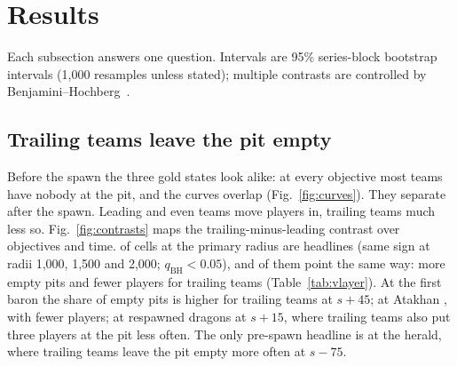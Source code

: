 \section{Results}
\label{sec:results}

Each subsection answers one question. Intervals are 95\% series-block bootstrap intervals (1,000 resamples unless stated); multiple contrasts are controlled by Benjamini--Hochberg~\cite{benjamini1995controlling}.

\subsection{Trailing teams leave the pit empty}
\label{sec:empty}


Before the spawn the three gold states look alike: at every objective most teams have nobody at the pit, and the curves overlap (Fig.~\ref{fig:curves}).
They separate after the spawn.
Leading and even teams move players in, trailing teams much less so.
Fig.~\ref{fig:contrasts} maps the trailing-minus-leading contrast over objectives and time.
 of  cells at the primary radius are headlines (same sign at radii 1,000, 1,500 and 2,000; $q_{\mathrm{BH}}<0.05$), and  of them point the same way: more empty pits and fewer players for trailing teams (Table~\ref{tab:vlayer}).
At the first baron the share of empty pits is \pp{}  higher for trailing teams at $s{+}45$; at Atakhan \pp{} , with   fewer players; at respawned dragons \pp{}  at $s{+}15$, where trailing teams also put three players at the pit \pp{}  less often.
The only pre-spawn headline is at the herald, where trailing teams leave the pit empty \pp{}  more often at $s{-}75$.



